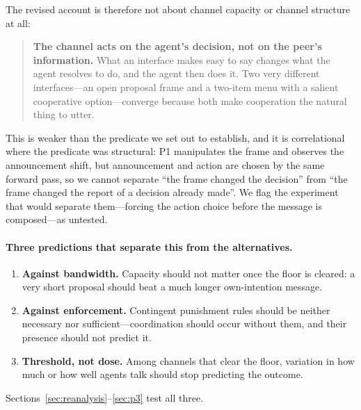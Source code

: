 The revised account is therefore not about channel capacity or channel structure at
all:

\begin{quote}
\textbf{The channel acts on the agent's decision, not on the peer's information.}
What an interface makes easy to say changes what the agent resolves to do, and the
agent then does it. Two very different interfaces---an open proposal frame and a
two-item menu with a salient cooperative option---converge because both make
cooperation the natural thing to utter.
\end{quote}

This is weaker than the predicate we set out to establish, and it is correlational
where the predicate was structural: P1 manipulates the frame and observes the
announcement shift, but announcement and action are chosen by the same forward pass, so
we cannot separate ``the frame changed the decision'' from ``the frame changed the
report of a decision already made''. We flag the experiment that would separate
them---forcing the action choice before the message is composed---as untested.

\paragraph{Three predictions that separate this from the alternatives.}
\begin{enumerate}[leftmargin=1.4em,itemsep=2pt,topsep=2pt]
\item \textbf{Against bandwidth.} Capacity should not matter once the floor is
cleared: a very short proposal should beat a much longer own-intention message.
\item \textbf{Against enforcement.} Contingent punishment rules should be neither
necessary nor sufficient---coordination should occur without them, and their presence
should not predict it.
\item \textbf{Threshold, not dose.} Among channels that clear the floor, variation in
how much or how well agents talk should stop predicting the outcome.
\end{enumerate}
Sections~\ref{sec:reanalysis}--\ref{sec:p3} test all three.

